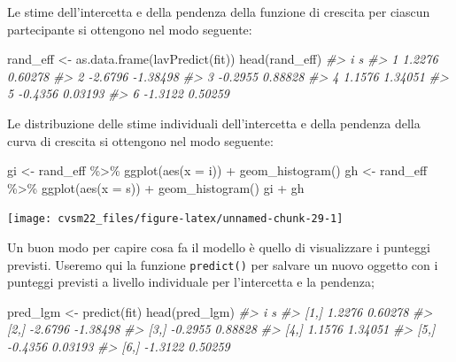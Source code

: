 \documentclass[
  11pt,
]{krantz}
\makeatletter
\newenvironment{Shaded}{\begin{snugshade}}{\end{snugshade}}
\newcommand{\AttributeTok}[1]{\textcolor[rgb]{0.61,0.61,0.61}{#1}}
\newcommand{\CommentTok}[1]{\textcolor[rgb]{0.37,0.37,0.37}{\textit{#1}}}
\newcommand{\FunctionTok}[1]{\textcolor[rgb]{0,0,0}{#1}}
\newcommand{\NormalTok}[1]{#1}
\newcommand{\OtherTok}[1]{\textcolor[rgb]{0.37,0.37,0.37}{#1}}
\newcommand{\SpecialCharTok}[1]{\textcolor[rgb]{0,0,0}{#1}}
\newenvironment{kframe}{%
\medskip{}
\setlength{\fboxsep}{.8em}
 \def\at@end@of@kframe{}%
 \ifinner\ifhmode%
  \def\at@end@of@kframe{\end{minipage}}%
  \begin{minipage}{\columnwidth}%
 \fi\fi%
 \def\FrameCommand##1{\hskip\@totalleftmargin \hskip-\fboxsep
 \colorbox{shadecolor}{##1}\hskip-\fboxsep
     \hskip-\linewidth \hskip-\@totalleftmargin \hskip\columnwidth}%
 \MakeFramed {\advance\hsize-\width
   \@totalleftmargin\z@ \linewidth\hsize
   \@setminipage}}%
 {\par\unskip\endMakeFramed%
 \at@end@of@kframe}
\renewenvironment{Shaded}{\begin{kframe}}{\end{kframe}}
\theoremstyle{definition}
\theoremstyle{definition}
\theoremstyle{definition}
\theoremstyle{definition}
\theoremstyle{remark}
\makeatother
\begin{document}
Le stime dell'intercetta e della pendenza della funzione di crescita per ciascun partecipante si ottengono nel modo seguente:

\begin{Shaded}
\begin{Highlighting}[]
\NormalTok{rand\_eff }\OtherTok{\textless{}{-}} \FunctionTok{as.data.frame}\NormalTok{(}\FunctionTok{lavPredict}\NormalTok{(fit))}
\FunctionTok{head}\NormalTok{(rand\_eff)}
\CommentTok{\#\textgreater{}         i        s}
\CommentTok{\#\textgreater{} 1  1.2276  0.60278}
\CommentTok{\#\textgreater{} 2 {-}2.6796 {-}1.38498}
\CommentTok{\#\textgreater{} 3 {-}0.2955  0.88828}
\CommentTok{\#\textgreater{} 4  1.1576  1.34051}
\CommentTok{\#\textgreater{} 5 {-}0.4356  0.03193}
\CommentTok{\#\textgreater{} 6 {-}1.3122  0.50259}
\end{Highlighting}
\end{Shaded}

Le distribuzione delle stime individuali dell'intercetta e della pendenza della curva di crescita si ottengono nel modo seguente:

\begin{Shaded}
\begin{Highlighting}[]
\NormalTok{gi }\OtherTok{\textless{}{-}}\NormalTok{ rand\_eff }\SpecialCharTok{\%\textgreater{}\%}
  \FunctionTok{ggplot}\NormalTok{(}\FunctionTok{aes}\NormalTok{(}\AttributeTok{x =}\NormalTok{ i)) }\SpecialCharTok{+}
  \FunctionTok{geom\_histogram}\NormalTok{()}
\NormalTok{gh }\OtherTok{\textless{}{-}}\NormalTok{ rand\_eff }\SpecialCharTok{\%\textgreater{}\%}
  \FunctionTok{ggplot}\NormalTok{(}\FunctionTok{aes}\NormalTok{(}\AttributeTok{x =}\NormalTok{ s)) }\SpecialCharTok{+}
  \FunctionTok{geom\_histogram}\NormalTok{()}
\NormalTok{gi }\SpecialCharTok{+}\NormalTok{ gh}
\end{Highlighting}
\end{Shaded}

\begin{center}\texttt{[image: cvsm22\_files/figure-latex/unnamed-chunk-29-1]} \end{center}

Un buon modo per capire cosa fa il modello è quello di visualizzare i punteggi previsti. Useremo qui la funzione \texttt{predict()} per salvare un nuovo oggetto con i punteggi previsti a livello individuale per l'intercetta e la pendenza;

\begin{Shaded}
\begin{Highlighting}[]
\NormalTok{pred\_lgm }\OtherTok{\textless{}{-}} \FunctionTok{predict}\NormalTok{(fit)}
\FunctionTok{head}\NormalTok{(pred\_lgm)}
\CommentTok{\#\textgreater{}            i        s}
\CommentTok{\#\textgreater{} [1,]  1.2276  0.60278}
\CommentTok{\#\textgreater{} [2,] {-}2.6796 {-}1.38498}
\CommentTok{\#\textgreater{} [3,] {-}0.2955  0.88828}
\CommentTok{\#\textgreater{} [4,]  1.1576  1.34051}
\CommentTok{\#\textgreater{} [5,] {-}0.4356  0.03193}
\CommentTok{\#\textgreater{} [6,] {-}1.3122  0.50259}
\end{Highlighting}
\end{Shaded}
\end{document}
